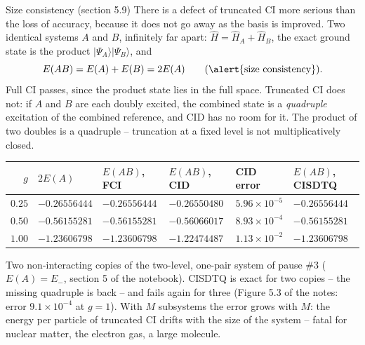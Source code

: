 \documentclass[aspectratio=169,10pt]{beamer}
\newcommand{\ket}[1]{\vert #1\rangle}
\begin{document}
\begin{frame}{Size consistency (section 5.9)}
  \footnotesize
  There is a defect of truncated CI more serious than the loss of accuracy, because it does not go away as the basis is improved. Two identical systems $A$ and $B$, infinitely far apart: $\hat{H}=\hat{H}_A+\hat{H}_B$, the exact ground state is the product $\ket{\Psi_A}\ket{\Psi_B}$, and
  \[
    E(AB)=E(A)+E(B)=2E(A)\qquad\text{(\alert{size consistency}).}
  \]
  Full CI passes, since the product state lies in the full space. Truncated CI does not: if $A$ and $B$ are each doubly excited, the combined state is a \emph{quadruple} excitation of the combined reference, and CID has no room for it. The product of two doubles is a quadruple -- truncation at a fixed level is not multiplicatively closed.
  \begin{center}
  \renewcommand{\arraystretch}{1.15}
  \begin{tabular}{rlllll}
    \toprule
    $g$ & $2E(A)$ & $E(AB)$, FCI & $E(AB)$, CID & CID error & $E(AB)$, CISDTQ\\
    \midrule
    $0.25$ & $-0.26556444$ & $-0.26556444$ & $-0.26550480$ & $5.96\times10^{-5}$ & $-0.26556444$\\
    $0.50$ & $-0.56155281$ & $-0.56155281$ & $-0.56066017$ & $8.93\times10^{-4}$ & $-0.56155281$\\
    $1.00$ & $-1.23606798$ & $-1.23606798$ & $-1.22474487$ & $1.13\times10^{-2}$ & $-1.23606798$\\
    \bottomrule
  \end{tabular}
  \end{center}
  Two non-interacting copies of the two-level, one-pair system of pause \#3 ($E(A)=E_-$, section 5 of the notebook). CISDTQ is exact for two copies -- the missing quadruple is back -- and fails again for three (Figure 5.3 of the notes: error $9.1\times10^{-4}$ at $g=1$). With $M$ subsystems the error grows with $M$: the energy per particle of truncated CI drifts with the size of the system -- fatal for nuclear matter, the electron gas, a large molecule.
\end{frame}
\end{document}
